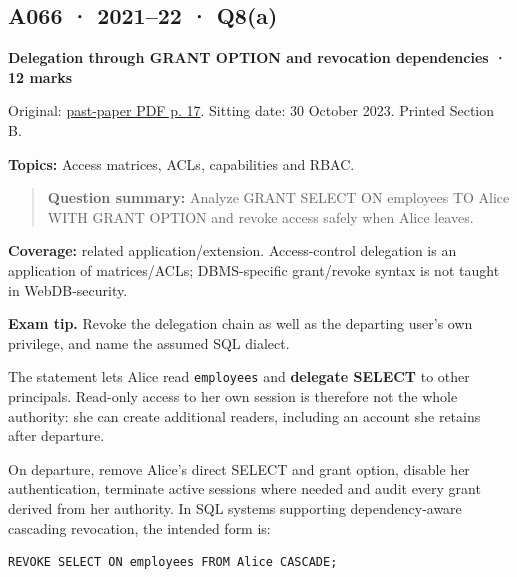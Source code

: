 \documentclass[11pt,a4paper]{article}
\begin{document}
\clearpage
\subsection{A066 · 2021–22 · Q8(a)}\label{a066}

\textbf{Delegation through GRANT OPTION and revocation dependencies · 12 marks}


Original: \href{../../CSE405-Security_Merged.pdf\#page=17}{past-paper PDF p. 17}. Sitting date: 30 October 2023. Printed Section B.


\textbf{Topics:} Access matrices,\allowbreak{} ACLs,\allowbreak{} capabilities and RBAC.



\begin{quote}\small

\textbf{Question summary:} Analyze GRANT SELECT ON employees TO Alice WITH GRANT OPTION and revoke access safely when Alice leaves.



\end{quote}

\textbf{Coverage:} related application/\allowbreak{}extension. Access-control delegation is an application of matrices/\allowbreak{}ACLs; DBMS-specific grant/\allowbreak{}revoke syntax is not taught in WebDB-security.



{\color{ForestGreen}\textbf{Exam tip.} Revoke the delegation chain as well as the departing user's own privilege,\allowbreak{} and name the assumed SQL dialect.}


The statement lets Alice read \texttt{employees} and \textbf{delegate SELECT} to other principals. Read-only access to her own session is therefore not the whole authority: she can create additional readers,\allowbreak{} including an account she retains after departure.


On departure,\allowbreak{} remove Alice's direct SELECT and grant option,\allowbreak{} disable her authentication,\allowbreak{} terminate active sessions where needed and audit every grant derived from her authority. In SQL systems supporting dependency-aware cascading revocation,\allowbreak{} the intended form is:



\begin{Verbatim}[breaklines=true,breakanywhere=true,fontsize=\small,frame=single,rulecolor=\color{PanelBorder}]
REVOKE SELECT ON employees FROM Alice CASCADE;
\end{Verbatim}
\end{document}
